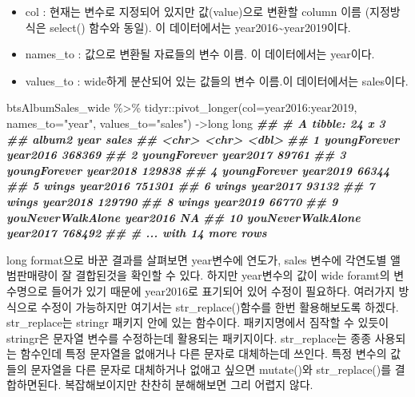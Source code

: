 \documentclass[
]{book}
\newenvironment{Shaded}{\begin{snugshade}}{\end{snugshade}}
\newcommand{\AttributeTok}[1]{\textcolor[rgb]{0.77,0.63,0.00}{#1}}
\newcommand{\DocumentationTok}[1]{\textcolor[rgb]{0.56,0.35,0.01}{\textbf{\textit{#1}}}}
\newcommand{\FunctionTok}[1]{\textcolor[rgb]{0.00,0.00,0.00}{#1}}
\newcommand{\NormalTok}[1]{#1}
\newcommand{\OtherTok}[1]{\textcolor[rgb]{0.56,0.35,0.01}{#1}}
\newcommand{\SpecialCharTok}[1]{\textcolor[rgb]{0.00,0.00,0.00}{#1}}
\newcommand{\StringTok}[1]{\textcolor[rgb]{0.31,0.60,0.02}{#1}}
\providecommand{\tightlist}{%
  \setlength{\itemsep}{0pt}\setlength{\parskip}{0pt}}
\theoremstyle{definition}
\theoremstyle{definition}
\theoremstyle{definition}
\theoremstyle{definition}
\theoremstyle{remark}
\begin{document}
\begin{itemize}
\tightlist
\item
  col : 현재는 변수로 지정되어 있지만 값(value)으로 변환할 column 이름 (지정방식은 select() 함수와 동일). 이 데이터에서는 year2016\textasciitilde year2019이다.
\item
  names\_to : 값으로 변환될 자료들의 변수 이름. 이 데이터에서는 year이다.
\item
  values\_to : wide하게 분산되어 있는 값들의 변수 이름.이 데이터에서는 sales이다.
\end{itemize}

\begin{Shaded}
\begin{Highlighting}[]
\NormalTok{btsAlbumSales\_wide }\SpecialCharTok{\%\textgreater{}\%} 
\NormalTok{  tidyr}\SpecialCharTok{::}\FunctionTok{pivot\_longer}\NormalTok{(}\AttributeTok{col=}\NormalTok{year2016}\SpecialCharTok{:}\NormalTok{year2019, }\AttributeTok{names\_to=}\StringTok{"year"}\NormalTok{, }\AttributeTok{values\_to=}\StringTok{"sales"}\NormalTok{) }\OtherTok{{-}\textgreater{}}\NormalTok{long}
\NormalTok{long}
\DocumentationTok{\#\# \# A tibble: 24 x 3}
\DocumentationTok{\#\#    album2            year      sales}
\DocumentationTok{\#\#    \textless{}chr\textgreater{}             \textless{}chr\textgreater{}     \textless{}dbl\textgreater{}}
\DocumentationTok{\#\#  1 youngForever      year2016 368369}
\DocumentationTok{\#\#  2 youngForever      year2017  89761}
\DocumentationTok{\#\#  3 youngForever      year2018 129838}
\DocumentationTok{\#\#  4 youngForever      year2019  66344}
\DocumentationTok{\#\#  5 wings             year2016 751301}
\DocumentationTok{\#\#  6 wings             year2017  93132}
\DocumentationTok{\#\#  7 wings             year2018 129790}
\DocumentationTok{\#\#  8 wings             year2019  66770}
\DocumentationTok{\#\#  9 youNeverWalkAlone year2016     NA}
\DocumentationTok{\#\# 10 youNeverWalkAlone year2017 768492}
\DocumentationTok{\#\# \# ... with 14 more rows}
\end{Highlighting}
\end{Shaded}

long format으로 바꾼 결과를 살펴보면 year변수에 연도가, sales 변수에 각연도별 앨범판매량이 잘 결합된것을 확인할 수 있다. 하지만 year변수의 값이 wide foramt의 변수명으로 들어가 있기 때문에 year2016로 표기되어 있어 수정이 필요하다. 여러가지 방식으로 수정이 가능하지만 여기서는 str\_replace()함수를 한번 활용해보도록 하겠다. str\_replace는 stringr 패키지 안에 있는 함수이다. 패키지명에서 짐작할 수 있듯이 stringr은 문자열 변수를 수정하는데 활용되는 패키지이다. str\_replace는 종종 사용되는 함수인데 특정 문자열을 없애거나 다른 문자로 대체하는데 쓰인다. 특정 변수의 값들의 문자열을 다른 문자로 대체하거나 없애고 싶으면 mutate()와 str\_replace()를 결합하면된다. 복잡해보이지만 찬찬히 분해해보면 그리 어렵지 않다.
\end{document}
